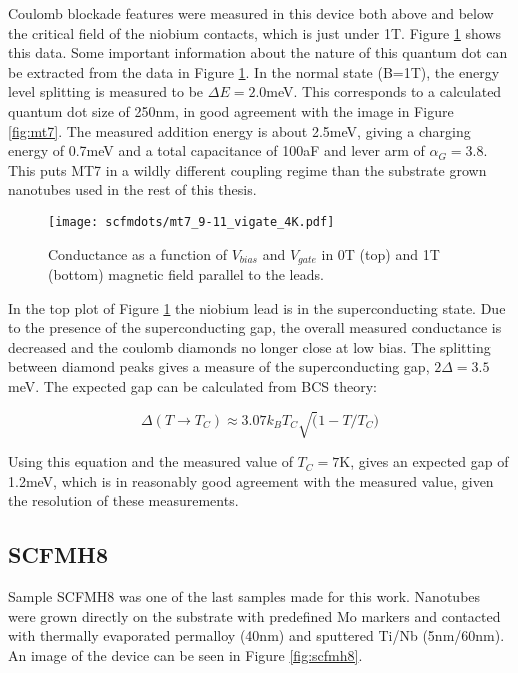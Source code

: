 Coulomb blockade features were measured in this device both above and below the critical field of the niobium contacts, which is just under 1T. Figure \ref{fig:mt7_coulomb} shows this data. Some important information about the nature of this quantum dot can be extracted from the data in Figure \ref{fig:mt7_coulomb}. In the normal state (B=1T), the energy level splitting is measured to be $\Delta E  = 2.0$meV. This corresponds to a calculated quantum dot size of 250nm, in good agreement with the image in Figure \ref{fig:mt7}. The measured addition energy is about 2.5meV, giving a charging energy of 0.7meV and a total capacitance of 100aF and lever arm of $\alpha_G = 3.8$. This puts MT7 in a wildly different coupling regime than the substrate grown nanotubes used in the rest of this thesis.

\begin{figure}
    \centering
    \texttt{[image: scfmdots/mt7\_9-11\_vigate\_4K.pdf]}
    \caption{Conductance as a function of $V_{bias}$ and $V_{gate}$ in 0T (top) and 1T (bottom) magnetic field parallel to the leads.}
    \label{fig:mt7_coulomb}
\end{figure}

In the top plot of Figure \ref{fig:mt7_coulomb} the niobium lead is in the superconducting state. Due to the presence of the superconducting gap, the overall measured conductance is decreased and the coulomb diamonds no longer close at low bias. The splitting between diamond peaks gives a measure of the superconducting gap, $2\Delta = 3.5$meV. The expected gap can be calculated from BCS theory:

\begin{equation}
    \label{eq:bcs_gap}
    \Delta (T \rightarrow T_C) \approx 3.07 k_B T_C \sqrt(1 - T/T_C)
\end{equation}

Using this equation and the measured value of $T_C = 7$K, gives an expected gap of 1.2meV, which is in reasonably good agreement with the measured value, given the resolution of these measurements.

\subsection*{SCFMH8}

Sample SCFMH8 was one of the last samples made for this work. Nanotubes were grown directly on the substrate with predefined Mo markers and contacted with thermally evaporated permalloy (40nm) and sputtered Ti/Nb (5nm/60nm). An image of the device can be seen in Figure \ref{fig:scfmh8}.

